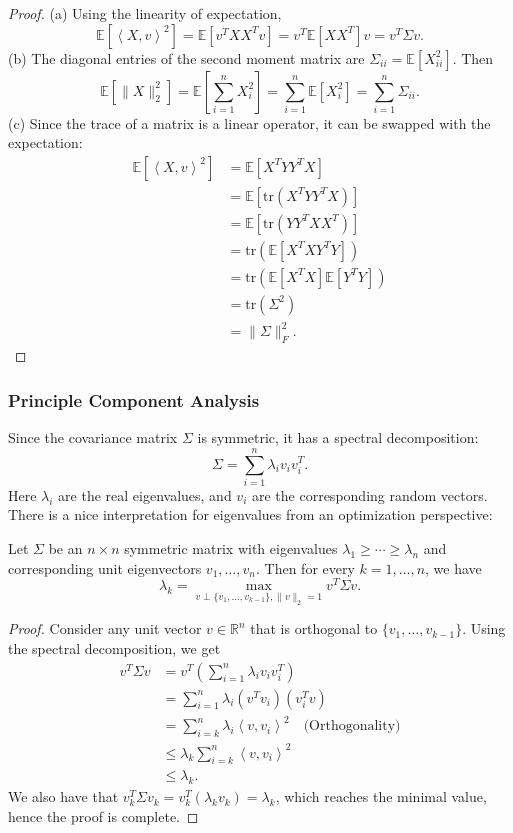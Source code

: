 \begin{proof}
(a) Using the linearity of expectation, 
\[ \mathbb{E}[\left\langle X, v \right\rangle^2] = \mathbb{E}[v^T XX^T v]
= v^T \mathbb{E}[XX^T] v = v^T \Sigma v. \]
(b) The diagonal entries of the second moment matrix are $\Sigma_{ii} = \mathbb{E}[X_{ii}^2]$. Then 
\[ \mathbb{E}[\lVert X \rVert_{2}^2] = \mathbb{E}\left[ \sum_{i = 1}^{n} X_i^2 \right] 
= \sum_{i = 1}^{n}\mathbb{E}[X_i^2] = \sum_{i = 1}^{n} \Sigma_{ii}. \]
(c) Since the trace of a matrix is a linear operator, it can be swapped with the expectation: 
\begin{align*}
	\mathbb{E}[\left\langle X, v \right\rangle^2] 
	&= \mathbb{E}[X^T YY^T X] \\
	&= \mathbb{E}[\mathrm{tr}(X^T YY^T X)] \\
	&= \mathbb{E}[\mathrm{tr}(YY^T XX^T)] \\
	&= \mathrm{tr}(\mathbb{E}[X^T X Y^T Y]) \\
	&= \mathrm{tr}(\mathbb{E}[X^T X] \mathbb{E}[Y^T Y]) \\
	&= \mathrm{tr}(\Sigma^2) \\
	&= \lVert \Sigma \rVert_{F}^2.
\end{align*}
\end{proof}


\subsubsection{Principle Component Analysis}
Since the covariance matrix $\Sigma$ is symmetric, it has a spectral decomposition: 
\[ \Sigma = \sum_{i = 1}^{n} \lambda_i v_i v_i^T. \]
Here $\lambda_i$ are the real eigenvalues, and $v_i$ are the corresponding random vectors. There is a nice 
interpretation for eigenvalues from an optimization perspective: 

\begin{proposition}[]
\label{prop:3.2.3}
Let $\Sigma$ be an $n \times n$ symmetric matrix with eigenvalues $\lambda_1 \geq \cdots \geq \lambda_n$ 
and corresponding unit eigenvectors $v_1, \dots, v_n$. Then for every $k = 1, \dots, n$, we have 
\[ \lambda_k = \max_{v \perp \{v_1, \dots, v_{k - 1}\}, \lVert v \rVert_{2} = 1} v^T \Sigma v. \]
\end{proposition}

\begin{proof}
Consider any unit vector $v \in \mathbb{R}^n$ that is orthogonal to $\{v_1, \dots, v_{k - 1}\}$. Using 
the spectral decomposition, we get 
\begin{align*}
	v^T \Sigma v 
	&= v^T \left( \sum_{i = 1}^{n} \lambda_i v_i v_i^T \right) \\
	&= \sum_{i = 1}^{n} \lambda_i (v^T v_i)(v_i^T v) \\
	&= \sum_{i = k}^{n} \lambda_i \left\langle v, v_i \right\rangle^2 \quad \text{(Orthogonality)} \\
	&\leq \lambda_k \sum_{i = k}^{n} \left\langle v, v_i \right\rangle^2 \\
	&\leq \lambda_k.
\end{align*}
We also have that $v_k^T \Sigma v_k = v_k^T (\lambda_k v_k) = \lambda_k$, which reaches the minimal value, 
hence the proof is complete.
\end{proof}

